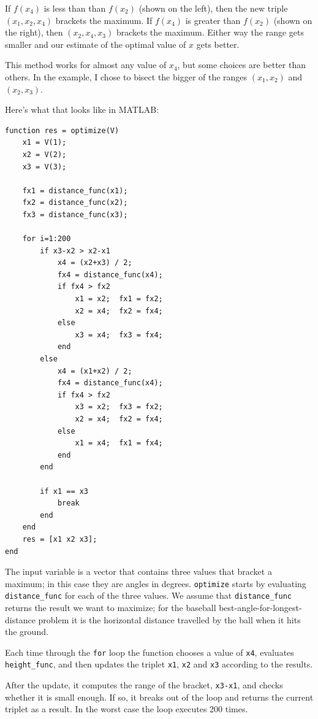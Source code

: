 \documentclass{book}
\begin{document}
If $f(x_4)$ is less than than $f(x_2)$ (shown on the left), then the
new triple $(x_1, x_2, x_4)$ brackets the maximum.  If $f(x_4)$ is
greater than $f(x_2)$ (shown on the right), then $(x_2, x_4, x_3)$
brackets the maximum.  Either way the range gets smaller and our
estimate of the optimal value of $x$ gets better.

This method works for almost any value of $x_4$, but some choices
are better than others.  In the example, I chose to bisect the
bigger of the ranges $(x_1, x_2)$ and $(x_2, x_3)$.

Here's what that looks like in MATLAB:

\begin{verbatim}
function res = optimize(V)
    x1 = V(1);
    x2 = V(2);
    x3 = V(3);
    
    fx1 = distance_func(x1);
    fx2 = distance_func(x2);
    fx3 = distance_func(x3);
   
    for i=1:200
        if x3-x2 > x2-x1
            x4 = (x2+x3) / 2;
            fx4 = distance_func(x4);
            if fx4 > fx2
                x1 = x2;  fx1 = fx2;
                x2 = x4;  fx2 = fx4;
            else
                x3 = x4;  fx3 = fx4;
            end
        else
            x4 = (x1+x2) / 2;
            fx4 = distance_func(x4);
            if fx4 > fx2
                x3 = x2;  fx3 = fx2;
                x2 = x4;  fx2 = fx4;
            else
                x1 = x4;  fx1 = fx4;
            end
        end

        if x1 == x3 
            break
        end
    end
    res = [x1 x2 x3];
end
\end{verbatim}

The input variable is a vector that contains three values that bracket
a maximum; in this case they are angles in degrees.  {\tt optimize}
starts by evaluating {\tt distance\_func} for each of the three values.
We assume that {\tt distance\_func} returns the result we want to
maximize; for the baseball best-angle-for-longest-distance problem 
it is the horizontal distance travelled by the 
ball when it hits the ground.


Each time through the {\tt for} loop the function chooses a value
of {\tt x4}, evaluates {\tt height\_func}, and then updates the
triplet {\tt x1}, {\tt x2} and {\tt x3} according to the results.

After the update, it computes the range of the bracket, {\tt x3-x1},
and checks whether it is small enough.  If so, it breaks out of
the loop and returns the current triplet as a result.  In the
worst case the loop executes 200 times.
\end{document}
